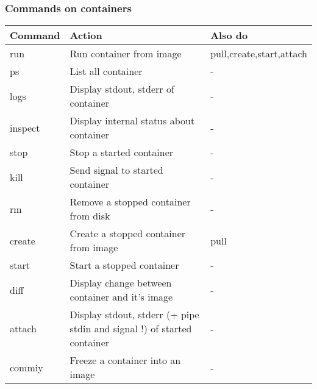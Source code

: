 \documentclass{beamer}
\begin{document}
\begin{frame}[fragile]
    \frametitle{Commands on containers}
    {\scriptsize
        \begin{table}
        \begin{tabular}{|l|p{5cm}|l|} \hline \rowcolor{lightgray}
Command       & Action                                        & Also do                   \\ \hline
run           & Run container from image                      & pull,create,start,attach  \\ \hline
ps            & List all container                            & -                         \\ \hline
logs          & Display stdout, stderr of container           & -                         \\ \hline
inspect       & Display internal status about container       & -                         \\ \hline
stop          & Stop a started container                      & -                         \\ \hline
kill          & Send signal to started container              & -                         \\ \hline
rm            & Remove a stopped container from disk          & -                         \\ \hline
create        & Create a stopped container from image         & pull                      \\ \hline
start         & Start a stopped container                     & -                         \\ \hline
diff          & Display change between container and it's image  & -                      \\ \hline
attach        & Display stdout, stderr \newline
                (+ pipe stdin and signal !) \newline
                of started container                          & -                         \\ \hline
commiy        & Freeze a container into an image              & -                         \\ \hline
        \end{tabular}
        \end{table}
    }
    \begin{center}
    \end{center}
\end{frame}
\end{document}
